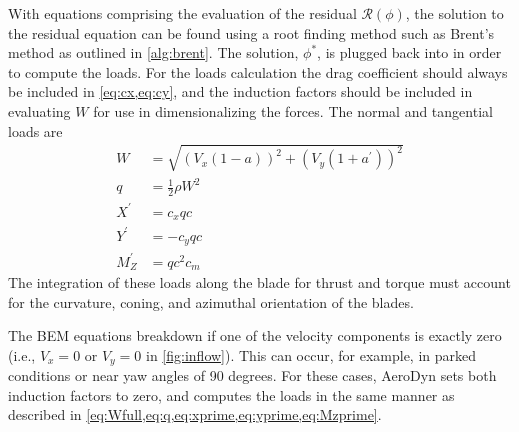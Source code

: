 \documentclass[]{aiaa-tc}%
\begin{document}
With equations  comprising the evaluation of the residual $\mathcal{R}(\phi)$, the solution to the residual equation can be found using a root finding method such as Brent's method\cite{Brent1971} as outlined in \cref{alg:brent}.  The solution, $\phi^*$, is plugged back into  in order to compute the loads.  For the loads calculation the drag coefficient should always be included in \cref{eq:cx,eq:cy}, and the induction factors should be included in evaluating $W$ for use in dimensionalizing the forces.  The normal and tangential loads are
\begin{align}
W &= \sqrt{\left( V_x (1-a)\right)^2 + \left( V_y (1+a^\prime)\right)^2} \label{eq:Wfull}\\
q &= \frac{1}{2}\rho W^2 \label{eq:q}\\
X^\prime &= c_x q c \label{eq:xprime}\\
Y^\prime &= -c_y q c \label{eq:yprime}\\
M_{Z}^\prime &= q c^2 c_m \label{eq:Mzprime}
\end{align}
The integration of these loads along the blade for thrust and torque must account for the curvature, coning, and azimuthal orientation of the blades.

The BEM equations breakdown if one of the velocity components is exactly zero (i.e., $V_x = 0$ or $V_y = 0$ in \cref{fig:inflow}).  This can occur, for example, in parked conditions or near yaw angles of 90 degrees.  For these cases, AeroDyn sets both induction factors to zero, and computes the loads in the same manner as described in \cref{eq:Wfull,eq:q,eq:xprime,eq:yprime,eq:Mzprime}.
\end{document}
